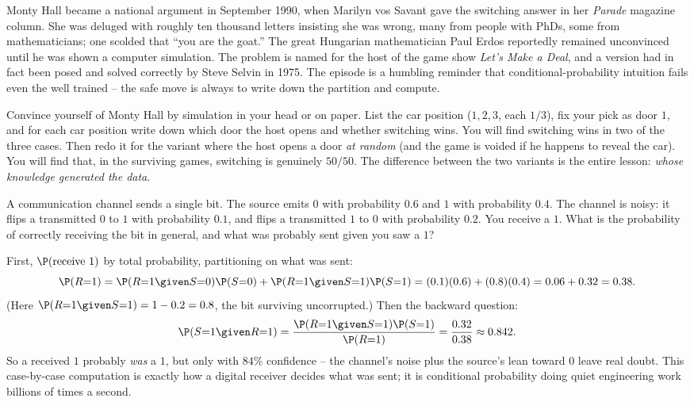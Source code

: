 \begin{historybox}
Monty Hall became a national argument in September 1990, when Marilyn vos Savant gave the switching answer in her \emph{Parade} magazine column. She was deluged with roughly ten thousand letters insisting she was wrong, many from people with PhDs, some from mathematicians; one scolded that ``you are the goat.'' The great Hungarian mathematician Paul Erdos reportedly remained unconvinced until he was shown a computer simulation. The problem is named for the host of the game show \emph{Let's Make a Deal}, and a version had in fact been posed and solved correctly by Steve Selvin in 1975. The episode is a humbling reminder that conditional-probability intuition fails even the well trained -- the safe move is always to write down the partition and compute.
\end{historybox}

\begin{labbox}
Convince yourself of Monty Hall by simulation in your head or on paper. List the car position ($1,2,3$, each $1/3$), fix your pick as door $1$, and for each car position write down which door the host opens and whether switching wins. You will find switching wins in two of the three cases. Then redo it for the variant where the host opens a door \emph{at random} (and the game is voided if he happens to reveal the car). You will find that, in the surviving games, switching is genuinely $50/50$. The difference between the two variants is the entire lesson: \emph{whose knowledge generated the data}.
\end{labbox}

\begin{example}
\label{ch04:ex-channel}
A communication channel sends a single bit. The source emits $0$ with probability $0.6$ and $1$ with probability $0.4$. The channel is noisy: it flips a transmitted $0$ to $1$ with probability $0.1$, and flips a transmitted $1$ to $0$ with probability $0.2$. You receive a $1$. What is the probability of correctly receiving the bit in general, and what was probably sent given you saw a $1$?

First, $\P(\text{receive }1)$ by total probability, partitioning on what was sent:
\[
\P(R{=}1) = \P(R{=}1\given S{=}0)\P(S{=}0) + \P(R{=}1\given S{=}1)\P(S{=}1)
= (0.1)(0.6) + (0.8)(0.4) = 0.06 + 0.32 = 0.38.
\]
(Here $\P(R{=}1\given S{=}1) = 1 - 0.2 = 0.8$, the bit surviving uncorrupted.) Then the backward question:
\[
\P(S{=}1 \given R{=}1) = \frac{\P(R{=}1\given S{=}1)\P(S{=}1)}{\P(R{=}1)} = \frac{0.32}{0.38} \approx 0.842.
\]
So a received $1$ probably \emph{was} a $1$, but only with $84\%$ confidence -- the channel's noise plus the source's lean toward $0$ leave real doubt. This case-by-case computation is exactly how a digital receiver decides what was sent; it is conditional probability doing quiet engineering work billions of times a second.
\end{example}

